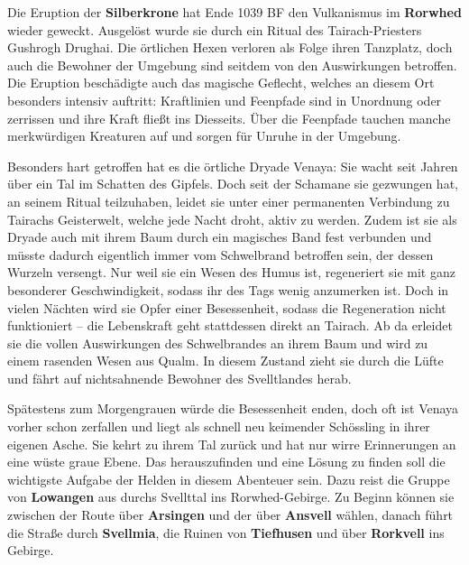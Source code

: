 

\spaltenanfang



Die Eruption der \textbf{Silberkrone} hat Ende 1039 BF den Vulkanismus im \textbf{Rorwhed} wieder geweckt.
Ausgelöst wurde sie durch ein Ritual des Tairach-Priesters Gushrogh Drughai.
Die örtlichen Hexen verloren als Folge ihren Tanzplatz, doch auch die Bewohner der Umgebung sind seitdem von den Auswirkungen betroffen.
Die Eruption beschädigte auch das magische Geflecht, welches an diesem Ort besonders intensiv auftritt:
Kraftlinien und Feenpfade sind in Unordnung oder zerrissen und ihre Kraft fließt ins Diesseits.
Über die Feenpfade tauchen manche merkwürdigen Kreaturen auf und sorgen für Unruhe in der Umgebung.


Besonders hart getroffen hat es die örtliche Dryade Venaya:
Sie wacht seit Jahren über ein Tal im Schatten des Gipfels.
Doch seit der Schamane sie gezwungen hat, an seinem Ritual teilzuhaben, leidet sie unter einer permanenten Verbindung zu Tairachs Geisterwelt, welche jede Nacht droht, aktiv zu werden.
Zudem ist sie als Dryade auch mit ihrem Baum durch ein magisches Band fest verbunden und müsste dadurch eigentlich immer vom Schwelbrand betroffen sein, der dessen Wurzeln versengt.
Nur weil sie ein Wesen des Humus ist, regeneriert sie mit ganz besonderer Geschwindigkeit, sodass ihr des Tags wenig anzumerken ist.
Doch in vielen Nächten wird sie Opfer einer Besessenheit, sodass die Regeneration nicht funktioniert -- die Lebenskraft geht stattdessen direkt an Tairach.
Ab da erleidet sie die vollen Auswirkungen des Schwelbrandes an ihrem Baum und wird zu einem rasenden Wesen aus Qualm.
In diesem Zustand zieht sie durch die Lüfte und fährt auf nichtsahnende Bewohner des Svelltlandes herab.

\vfill

Spätestens zum Morgengrauen würde die Besessenheit enden, doch oft ist Venaya vorher schon zerfallen und liegt als schnell neu keimender Schössling in ihrer eigenen Asche.
Sie kehrt zu ihrem Tal zurück und hat nur wirre Erinnerungen an eine wüste graue Ebene.
Das herauszufinden und eine Lösung zu finden soll die wichtigste Aufgabe der Helden in diesem Abenteuer sein.
Dazu reist die Gruppe von \textbf{Lowangen} aus durchs Svellttal ins Rorwhed-Gebirge.
Zu Beginn können sie zwischen der Route über \textbf{Arsingen} und der über \textbf{Ansvell} wählen, danach führt die Straße durch \textbf{Svellmia}, die Ruinen von \textbf{Tiefhusen} und über \textbf{Rorkvell} ins Gebirge.

